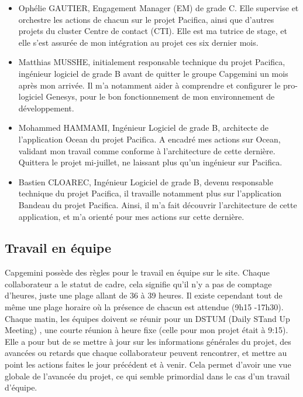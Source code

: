 \documentclass{rapport}
\begin{document}
\begin{itemize}
  \item Ophélie GAUTIER, Engagement Manager (EM) de grade C. Elle supervise et orchestre les actions de chacun sur le projet Pacifica, ainsi que d'autres projets du cluster Centre de contact (CTI). Elle est ma tutrice de stage, et elle s'est assurée de mon intégration au projet ces six dernier mois.\\
  
  \item Matthias MUSSHE, initialement responsable technique du projet Pacifica, ingénieur logiciel de grade B avant de quitter le groupe Capgemini un mois après mon arrivée. Il m'a notamment aider à comprendre et configurer le pro-logiciel Genesys, pour le bon fonctionnement de mon environnement de développement.\\
  
  \item Mohammed HAMMAMI, Ingénieur Logiciel de grade B, architecte de l'application Ocean du projet Pacifica. A encadré mes actions sur Ocean, validant mon travail comme conforme à l'architecture de cette dernière. Quittera le projet mi-juillet, ne laissant plus qu'un ingénieur sur Pacifica.\\
  
  \item Bastien CLOAREC, Ingénieur Logiciel de grade B, devenu responsable technique du projet Pacifica, il travaille notamment plus sur l'application Bandeau du projet Pacifica. Ainsi, il m'a fait découvrir l'architecture de cette application, et m'a orienté pour mes actions sur cette dernière.\\
  
\end{itemize}

\subsection{Travail en équipe}
Capgemini possède des règles pour le travail en équipe sur le site. Chaque collaborateur a le statut de cadre, cela signifie qu'il n'y a pas de comptage d'heures, juste une plage allant de 36 à 39 heures. Il existe cependant tout de même une plage horaire où la présence de chacun est attendue (9h15 -17h30).\\

Chaque matin, les équipes doivent se réunir pour un DSTUM (Daily STand Up Meeting) , une courte réunion à heure fixe (celle pour mon projet était à 9:15). Elle a pour but de se mettre à jour sur les informations générales du projet, des avancées ou retards que chaque collaborateur peuvent rencontrer, et mettre au point les actions faites le jour précédent et à venir. Cela permet d'avoir une vue globale de l'avancée du projet, ce qui semble primordial dans le cas d'un travail d'équipe.\\
\end{document}
